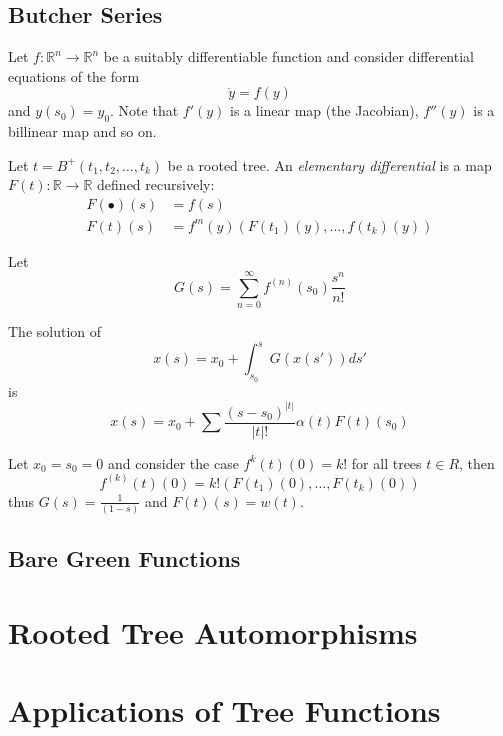  \subsection{Butcher Series}
 Let $f: \mathbb{R}^n \rightarrow \mathbb{R}^n$ be a suitably differentiable function and consider differential equations of the form 
 \[
  \dot{y} = f(y)
 \]
and $y(s_0) = y_0$.  Note that $f'(y)$ is a linear map (the Jacobian), $f''(y)$ is a billinear map and so on.  

\begin{defn}
Let $t = B^{+}(t_1,t_2,\dots,t_k)$ be  a rooted tree. An \emph{elementary differential} is a map  $F(t):  \mathbb{R} \rightarrow \mathbb{R}$ defined 
recursively:
\begin{align}
 F(\bullet)(s) &= f(s) \\%
 F(t)(s) &= f^{m}(y)(F(t_1)(y),\dots,f(t_k)(y))
 \end{align}
\end{defn}
Let
\[
 G(s) = \sum_{n=0}^{\infty}f^{(n)}(s_0) \frac{s^n}{n!}
\]
\begin{theorem}
 The solution of 
 \[
  x(s) = x_0 + \int_{s_0}^{s} G(x(s')) ds'
 \]
is
\[
 x(s) = x_0 + \sum \frac{(s-s_0)^{\lvert t \rvert}}{\lvert t \rvert !}\alpha(t)F(t)(s_0)
\]
\end{theorem}
\begin{ex}
 Let $x_0 = s_0 = 0$  and consider the case $f^{k}(t)(0) = k!$ for all trees $t \in R$, then 
 \[
 f^{(k)}(t)(0) = k!(F(t_1)(0),\dots,F(t_k)(0))
 \]
 thus $G(s) = \frac{1}{(1-s)}$ and $F(t)(s) = w(t)$.  
 
\end{ex}


\subsection{Bare Green Functions}

\section{Rooted Tree Automorphisms}



\section{Applications of Tree Functions}


